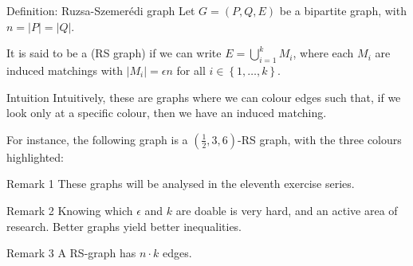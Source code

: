\documentclass[a4paper]{article}
\begin{document}
\begin{parag}{Definition: Ruzsa-Szemerédi graph}
    Let $G = \left(P, Q, E\right)$ be a bipartite graph, with $n = \left|P\right| = \left|Q\right|$.

    It is said to be a  (RS graph) if we can write $E = \bigcup_{i=1}^{k} M_i$, where each $M_i$ are induced matchings with $\left|M_i\right| = \epsilon n$ for all $i \in \left\{1, \ldots, k\right\}$.

    \begin{subparag}{Intuition}
        Intuitively, these are graphs where we can colour edges such that, if we look only at a specific colour, then we have an induced matching. 

        For instance, the following graph is a $\left(\frac{1}{2}, 3, 6\right)$-RS graph, with the three colours highlighted:
    \end{subparag}

    \begin{subparag}{Remark 1}
        These graphs will be analysed in the eleventh exercise series.
    \end{subparag}

    \begin{subparag}{Remark 2}
        Knowing which $\epsilon$ and $k$ are doable is very hard, and an active area of research. Better graphs yield better inequalities.
    \end{subparag}
    
    \begin{subparag}{Remark 3}
        A RS-graph has $n\cdot k$ edges.
    \end{subparag}
\end{parag}
\end{document}
